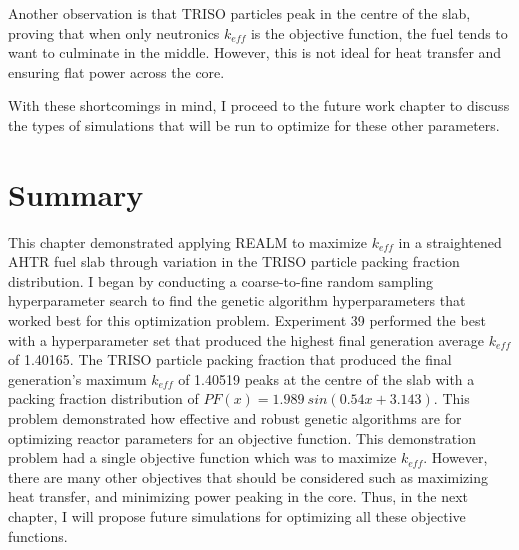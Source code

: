 Another observation is that TRISO particles peak in the centre of the slab, 
proving that when only neutronics $k_{eff}$ is the objective function, the 
fuel tends to want to culminate in the middle. 
However, this is not ideal for heat transfer and ensuring flat power across 
the core. 

With these shortcomings in mind, I proceed to the future work chapter to discuss 
the types of simulations that will be run to optimize for these other parameters. 



\section{Summary}
This chapter demonstrated applying \gls{REALM} to maximize $k_{eff}$ in a 
straightened \acrfull{AHTR} fuel slab through variation in the \gls{TRISO} 
particle packing fraction distribution. 
I began by conducting a coarse-to-fine random sampling hyperparameter search to 
find the genetic algorithm hyperparameters that worked best for this optimization 
problem.
Experiment 39 performed the best with a hyperparameter set that produced the 
highest final generation average $k_{eff}$ of 1.40165. 
The \gls{TRISO} particle packing fraction that produced the final generation's 
maximum $k_{eff}$ of 1.40519 peaks at the centre of the slab with a packing 
fraction distribution of $PF(x)=1.989\ sin(0.54x+3.143)$. 
This problem demonstrated how effective and robust genetic algorithms are for 
optimizing reactor parameters for an objective function. 
This demonstration problem had a single objective function which was to maximize 
$k_{eff}$. 
However, there are many other objectives that should be considered such as 
maximizing heat transfer, and minimizing power peaking in the core. 
Thus, in the next chapter, I will propose future simulations for optimizing
all these objective functions.
